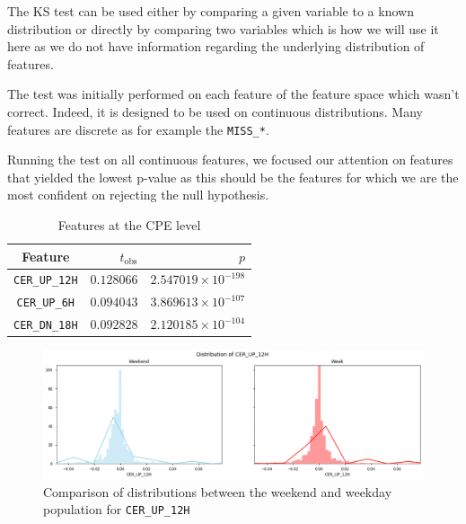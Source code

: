 The KS test can be used either by comparing a given variable to a known distribution or directly by comparing two variables which is how we will use it here as we do not have information regarding the underlying distribution of features. 

The test was initially performed on each feature of the feature space which wasn't correct. Indeed, it is designed to be used on continuous distributions. Many features are discrete as for example the \texttt{MISS\_*}. 

Running the test on all continuous features, we focused our attention on features that yielded the lowest p-value as this should be the features for which we are the most confident on rejecting the null hypothesis. 

\begin{table}[h]
\begin{center}
\begin{tabular}{c r r}
\hline
\textbf{Feature} & \textbf{$t_\text{obs}$} & $p$\\ 
\hline\hline
\texttt{CER\_UP\_12H} & $0.128066$ &	 $2.547019\times 10^{-198}$\\
\hline
\texttt{CER\_UP\_6H} &  $0.094043$ & $3.869613\times 10^{-107}$\\
\hline
\texttt{CER\_DN\_18H} & $0.092828$ &	 $2.120185\times 10^{-104}$\\
\end{tabular}
\end{center}
\caption{\label{CPEMes}Features at the CPE level}
\end{table}

\begin{figure}[ht]
    \begin{center}
    \includegraphics[width=1\linewidth]{images/KS_CER_UP_12.png}    
    \end{center}
    \caption{Comparison of distributions between the weekend and weekday population for \texttt{CER\_UP\_12H}}
    \label{KS_CER_UP_12}
\end{figure}

